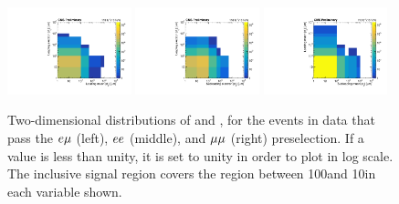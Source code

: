 \begin{figure}[hbtp]
\centering
\includegraphics[width=0.32\textwidth]{figures/results/d0vsd0_emu_CMSPreliminary.pdf}
\includegraphics[width=0.32\textwidth]{figures/results/d0vsd0_ee_CMSPreliminary.pdf}
\includegraphics[width=0.32\textwidth]{figures/results/d0vsd0_mumu_CMSPreliminary.pdf}
\caption{
Two-dimensional distributions of \ada and \adb, for the events in data that pass the $e{\mu}$ (left), $ee$ (middle), and ${\mu}{\mu}$ (right) preselection. If a \ad value is less than unity, it is set to unity in order to plot in log scale. The inclusive signal region covers the region between 100\mum and 10\cm in each \ad variable shown.
}
\label{d0_d0_data}
\end{figure}

